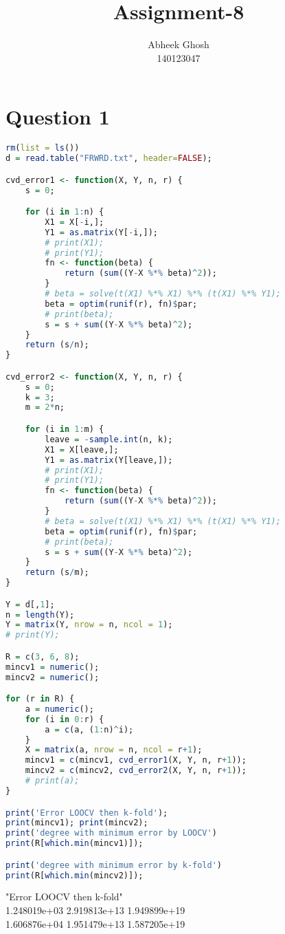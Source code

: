 \documentclass{article}
\begin{document}
	\title{\textbf{Assignment-8}}
	\author{Abheek Ghosh \\ 
		140123047 }
	
	\maketitle
	

\section{Question 1}


\begin{lstlisting}[language=R]
rm(list = ls())
d = read.table("FRWRD.txt", header=FALSE);

cvd_error1 <- function(X, Y, n, r) {
	s = 0;

	for (i in 1:n) {
		X1 = X[-i,];
		Y1 = as.matrix(Y[-i,]);
		# print(X1);
		# print(Y1);
		fn <- function(beta) {
			return (sum((Y-X %*% beta)^2));
		}
		# beta = solve(t(X1) %*% X1) %*% (t(X1) %*% Y1);
		beta = optim(runif(r), fn)$par;
		# print(beta);
		s = s + sum((Y-X %*% beta)^2);
	}
	return (s/n);
}

cvd_error2 <- function(X, Y, n, r) {
	s = 0;
	k = 3;
	m = 2*n;

	for (i in 1:m) {
		leave = -sample.int(n, k);
		X1 = X[leave,];
		Y1 = as.matrix(Y[leave,]);
		# print(X1);
		# print(Y1);
		fn <- function(beta) {
			return (sum((Y-X %*% beta)^2));
		}
		# beta = solve(t(X1) %*% X1) %*% (t(X1) %*% Y1);
		beta = optim(runif(r), fn)$par;
		# print(beta);
		s = s + sum((Y-X %*% beta)^2);
	}
	return (s/m);
}

Y = d[,1];
n = length(Y);
Y = matrix(Y, nrow = n, ncol = 1);
# print(Y);

R = c(3, 6, 8);
mincv1 = numeric();
mincv2 = numeric();

for (r in R) {
	a = numeric();
	for (i in 0:r) {
		a = c(a, (1:n)^i);
	}
	X = matrix(a, nrow = n, ncol = r+1);
	mincv1 = c(mincv1, cvd_error1(X, Y, n, r+1));
	mincv2 = c(mincv2, cvd_error2(X, Y, n, r+1));
	# print(a);
}

print('Error LOOCV then k-fold');
print(mincv1); print(mincv2);
print('degree with minimum error by LOOCV')
print(R[which.min(mincv1)]);

print('degree with minimum error by k-fold')
print(R[which.min(mincv2)]);
\end{lstlisting}

"Error LOOCV then k-fold"\\
1.248019e+03 2.919813e+13 1.949899e+19\\
1.606876e+04 1.951479e+13 1.587205e+19\\
\end{document}
